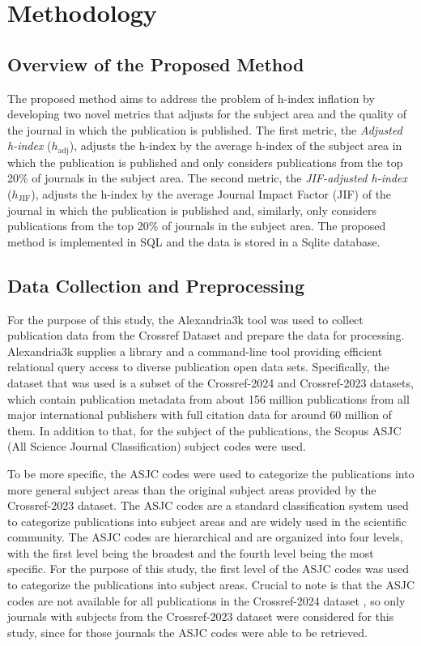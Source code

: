 \chapter{Methodology}
\label{ch:methods}

\section{Overview of the Proposed Method}

The proposed method aims to address the problem of h-index inflation by
developing two novel metrics that adjusts for the subject area and the quality
of the journal in which the publication is published. The first metric, the
\textit{Adjusted h-index} ($h_{\text{adj}}$), adjusts the h-index by the
average h-index of the subject area in which the publication is published and
only considers publications from the top 20\% of journals in the subject area.
The second metric, the \textit{JIF-adjusted h-index} ($h_{\text{JIF}}$),
adjusts the h-index by the average Journal Impact Factor (JIF) of the journal
in which the publication is published and, similarly, only considers
publications from the top 20\% of journals in the subject area. The proposed
method is implemented in SQL and the data is stored in a Sqlite database.

\section{Data Collection and Preprocessing}

For the purpose of this study, the Alexandria3k \cite{Spi23g} tool was used to
collect publication data from the Crossref Dataset \cite{Crossref2020} and
prepare the data for processing. Alexandria3k supplies a library and a
command-line tool providing efficient relational query access to diverse
publication open data sets. Specifically, the dataset that was used is a subset
of the Crossref-2024 and Crossref-2023 datasets, which contain publication
metadata from about 156 million publications from all major international
publishers with full citation data for around 60 million of them. In addition
to that, for the subject of the publications, the Scopus ASJC (All Science
Journal Classification) subject codes were used.

To be more specific, the ASJC codes were used to categorize the publications
into more general subject areas than the original subject areas provided by the
Crossref-2023 dataset. The ASJC codes are a standard classification system used
to categorize publications into subject areas and are widely used in the
scientific community. The ASJC codes are hierarchical and are organized into
four levels, with the first level being the broadest and the fourth level being
the most specific. For the purpose of this study, the first level of the ASJC
codes was used to categorize the publications into subject areas. Crucial to
note is that the ASJC codes are not available for all publications in the
Crossref-2024 dataset \cite{crossrefSubjectCodes2024}, so only journals with
subjects from the Crossref-2023 dataset were considered for this study, since
for those journals the ASJC codes were able to be retrieved.


